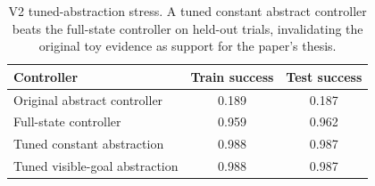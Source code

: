 \begin{table}[t]
\centering
\caption{V2 tuned-abstraction stress. A tuned constant abstract controller beats the full-state controller on held-out trials, invalidating the original toy evidence as support for the paper's thesis.}
\label{tab:tuned-abstraction}
\begin{tabular}{lcc}
\toprule
Controller & Train success & Test success \\
\midrule
Original abstract controller & 0.189 & 0.187 \\
Full-state controller & 0.959 & 0.962 \\
Tuned constant abstraction & 0.988 & 0.987 \\
Tuned visible-goal abstraction & 0.988 & 0.987 \\
\bottomrule
\end{tabular}
\end{table}
